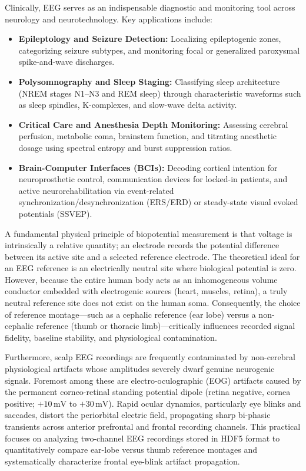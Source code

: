 \documentclass[12pt,a4paper]{article}
\begin{document}
Clinically, EEG serves as an indispensable diagnostic and monitoring tool across neurology and neurotechnology. Key applications include:
\begin{itemize}
    \item \textbf{Epileptology and Seizure Detection:} Localizing epileptogenic zones, categorizing seizure subtypes, and monitoring focal or generalized paroxysmal spike-and-wave discharges.
    \item \textbf{Polysomnography and Sleep Staging:} Classifying sleep architecture (NREM stages N1--N3 and REM sleep) through characteristic waveforms such as sleep spindles, K-complexes, and slow-wave delta activity.
    \item \textbf{Critical Care and Anesthesia Depth Monitoring:} Assessing cerebral perfusion, metabolic coma, brainstem function, and titrating anesthetic dosage using spectral entropy and burst suppression ratios.
    \item \textbf{Brain-Computer Interfaces (BCIs):} Decoding cortical intention for neuroprosthetic control, communication devices for locked-in patients, and active neurorehabilitation via event-related synchronization/desynchronization (ERS/ERD) or steady-state visual evoked potentials (SSVEP).
\end{itemize}

A fundamental physical principle of biopotential measurement is that voltage is intrinsically a relative quantity; an electrode records the potential difference between its active site and a selected reference electrode. The theoretical ideal for an EEG reference is an electrically neutral site where biological potential is zero. However, because the entire human body acts as an inhomogeneous volume conductor embedded with electrogenic sources (heart, muscles, retina), a truly neutral reference site does not exist on the human soma. Consequently, the choice of reference montage—such as a cephalic reference (ear lobe) versus a non-cephalic reference (thumb or thoracic limb)—critically influences recorded signal fidelity, baseline stability, and physiological contamination.

Furthermore, scalp EEG recordings are frequently contaminated by non-cerebral physiological artifacts whose amplitudes severely dwarf genuine neurogenic signals. Foremost among these are electro-oculographic (EOG) artifacts caused by the permanent corneo-retinal standing potential dipole (retina negative, cornea positive; $+10\,\mathrm{mV}$ to $+30\,\mathrm{mV}$). Rapid ocular dynamics, particularly eye blinks and saccades, distort the periorbital electric field, propagating sharp bi-phasic transients across anterior prefrontal and frontal recording channels. This practical focuses on analyzing two-channel EEG recordings stored in HDF5 format to quantitatively compare ear-lobe versus thumb reference montages and systematically characterize frontal eye-blink artifact propagation.
\end{document}

